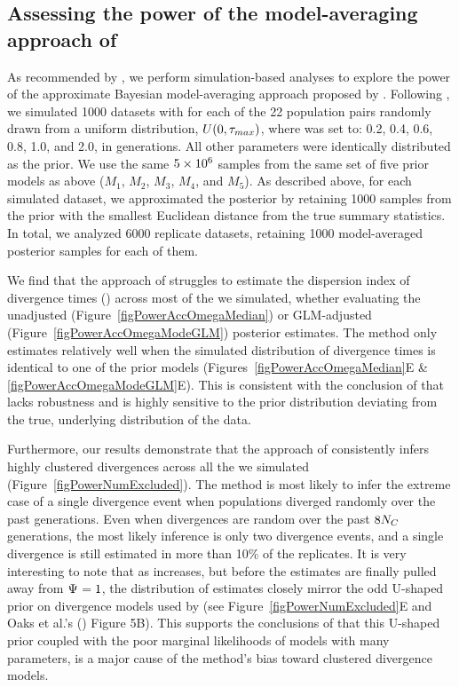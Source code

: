\documentclass[letterpaper,12pt]{article}
\begin{document}
\begin{linenumbers}
\section*{Assessing the power of the model-averaging approach of
    \citet{Hickerson2013}}

As recommended by \citet{Oaks2012}, we perform simulation-based analyses
to explore the power of the approximate Bayesian model-averaging approach
proposed by \citet{Hickerson2013}.
Following \citet{Oaks2012}, we simulated 1000 datasets with \divt{} for each of
the 22 population pairs randomly drawn from a uniform distribution, $U(0,
\tau_{max})$, where  was set to: 0.2, 0.4, 0.6, 0.8, 1.0, and 2.0, in
\globalcoalunit generations.
All other parameters were identically distributed as the prior.
We use the same $5\times 10^{6}$ samples from the same set of five prior models as above
($M_1$, $M_2$, $M_3$, $M_4$, and $M_5$).
As described above, for each simulated dataset, we approximated the posterior
by retaining 1000 samples from the prior with the smallest Euclidean distance
from the true summary statistics.
In total, we analyzed 6000 replicate datasets, retaining 1000 model-averaged
posterior samples for each of them.

We find that the approach of \citet{Hickerson2013} struggles to estimate the
dispersion index of divergence times (\vmratio{}) across most of the 
we simulated, whether evaluating the unadjusted
(Figure~\ref{figPowerAccOmegaMedian}) or GLM-adjusted
(Figure~\ref{figPowerAccOmegaModeGLM}) posterior estimates.
The method only estimates \vmratio{} relatively well when the simulated
distribution of divergence times is identical to one of the prior models
(Figures~\ref{figPowerAccOmegaMedian}E \& \ref{figPowerAccOmegaModeGLM}E).
This is consistent with the conclusion of \citet{Oaks2012} that \msb lacks
robustness and is highly sensitive to the prior distribution deviating from the
true, underlying distribution of the data.

Furthermore, our results demonstrate that the approach of \citet{Hickerson2013}
consistently infers highly clustered divergences across all the  we
simulated (Figure~\ref{figPowerNumExcluded}).
The method is most likely to infer the extreme case of a single divergence event
when populations diverged randomly over the past \globalcoalunit generations.
Even when divergences are random over the past $8N_C$ generations,
the most likely inference is only two divergence events, and a single 
divergence is still estimated in more than 10\% of the replicates.
It is very interesting to note that as  increases, but before the
estimates are finally pulled away from $\Psi_{} = 1$, the distribution of
\numt{} estimates closely mirror the odd U-shaped prior on divergence models
used by \msb (see Figure~\ref{figPowerNumExcluded}E and Oaks et al.'s
(\citeyear{Oaks2012}) Figure 5B).
This supports the conclusions of \citet{Oaks2012} that this U-shaped
prior coupled with the poor marginal likelihoods of models with many
\divt{} parameters, is a major cause of the method's bias toward
clustered divergence models.


\end{linenumbers}
\end{document}
